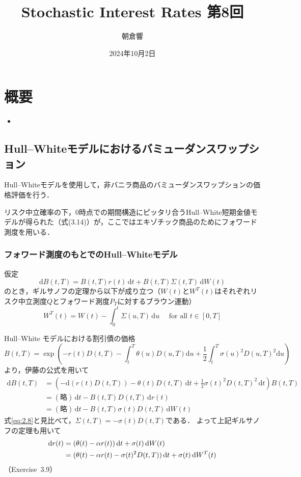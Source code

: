 \documentclass[a4paper, lualatex, ja=standard]{bxjsarticle}
\title{Stochastic Interest Rates 第8回}
\author{朝倉響}
\date{2024年10月2日}
\theoremstyle{theorem}
\theoremstyle{definition}
\theoremstyle{definition}
\newcommand{\diff}{\mathrm{d}}
\begin{document}
\maketitle

\section*{概要}
\begin{itemize}
  \item 
\end{itemize}

\setcounter{section}{3}
\setcounter{subsection}{5}
\setcounter{equation}{27}
\setcounter{thm}{8}
\subsection{Hull--Whiteモデルにおけるバミューダンスワップション}
Hull--Whiteモデルを使用して，非バニラ商品のバミューダンスワップションの価格評価を行う．

リスク中立確率の下，$0$時点での期間構造にピッタリ合うHull--White短期金値モデルが得られた（式(3.14)）が，ここではエキゾチック商品のためにフォワード測度を用いる．

\subsubsection*{フォワード測度のもとでのHull--Whiteモデル}
仮定
\begin{equation}
  \diff B(t,T) = B(t,T)r(t)\,\diff t + B(t,T)\Sigma(t,T)\,\diff W(t) \tag{2.8}
  \label{eq:2.8}
\end{equation}
のとき，ギルサノフの定理から以下が成り立つ（$W(t)$と$W^T(t)$はそれぞれリスク中立測度$Q$とフォワード測度$P_T$に対するブラウン運動）
\begin{equation*}
  W^T(t)=W(t)-\int_0^t \Sigma(u, T) \,\diff u \quad \text { for all } t \in[0, T]
\end{equation*}

Hull--White モデルにおける割引債の価格
\begin{equation}
  B(t, T)=\exp \left(-r(t) D(t, T)-  \int_t^T \theta(u) D(u, T) \diff u +\frac{1}{2} \int_t^T \sigma(u)^2 D(u, T)^2 \diff u\right) \tag{3.10}
\end{equation}
より，伊藤の公式を用いて
\begin{align*}
  \diff B(t,T) &= (-\diff(r(t)D(t,T)) - \theta(t)D(t,T)\,\diff t + \frac{1}{2} \sigma(t)^2D(t,T)^2\,\diff t)B(t,T) \\
  &= (\text{略})\,\diff t - B(t,T)D(t,T)\,\diff r(t) \\
  &= (\text{略})\,\diff t - B(t,T) \sigma(t)D(t,T)\,\diff W(t)
\end{align*}
式\eqref{eq:2.8}と見比べて，$\Sigma(t,T) = -\sigma(t)D(t,T)$である．
よって上記ギルサノフの定理も用いて
\begin{align}
  \diff r(t) &= (\theta(t) - \alpha r(t)) \,\diff t + \sigma(t)\,\diff W(t) \notag\\
  &= (\theta(t) - \alpha r(t) - \sigma(t)^2D(t,T))\,\diff t + \sigma(t)\,\diff W^T(t) 
\end{align}
（Exercise~3.9）
\end{document}
